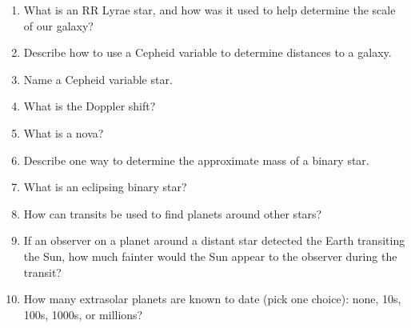
\begin{enumerate}
\item What is an RR Lyrae star, and how was it used to help determine
  the scale of our galaxy?
\vspace{80pt}
\item Describe how to use a Cepheid variable to determine distances to
  a galaxy.
\vspace{80pt}
\item Name a Cepheid variable star.
\vspace{80pt}
\item What is the Doppler shift? 
\vspace{80pt}
\item What is a nova?
\vspace{80pt}
\item Describe one way to determine the approximate mass of a binary
  star.
\vspace{80pt}
\item What is an eclipsing binary star?
\vspace{80pt}
\item How can transits be used to find planets around other stars? 
\vspace{80pt}
\item If an observer on a planet around a distant star detected the
  Earth transiting the Sun, how much fainter would the Sun appear to
  the observer during the transit?
\vspace{80pt}
\item How many extrasolar planets are known to date (pick one choice):
  none, 10s, 100s, 1000s, or millions?
\vspace{80pt} 
\end{enumerate}
